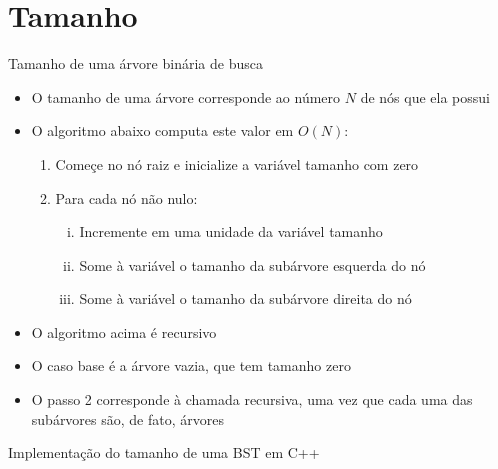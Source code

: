 \section{Tamanho}

\begin{frame}[fragile]{Tamanho de uma árvore binária de busca}

    \begin{itemize}
        \item O tamanho de uma árvore corresponde ao número $N$ de nós que ela possui

        \item O algoritmo abaixo computa este valor em $O(N)$:

        \begin{enumerate}

            \item Começe no nó {raiz} e inicialize a variável tamanho com 
            {zero}

            \item Para cada nó {não nulo}:

            \begin{enumerate}[i.]
                \item Incremente em {uma} unidade da variável {tamanho}

                \item {Some} à variável o tamanho da subárvore {esquerda} do nó

                \item {Some} à variável o tamanho da subárvore {direita} do nó
            \end{enumerate}

        \end{enumerate}

        \item O algoritmo acima é recursivo

        \item O caso base é a árvore vazia, que tem tamanho zero

        \item O passo 2 corresponde à chamada recursiva, uma vez que cada uma das subárvores são,
            de fato, árvores

    \end{itemize}
\end{frame} 

\begin{frame}[fragile]{Implementação do tamanho de uma BST em C++}
\end{frame}

